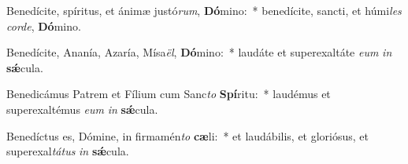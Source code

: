 \item Benedícite, spíritus, et ánimæ justó\textit{rum}, \textbf{Dó}mino:~* benedícite, sancti, et húmi\textit{les} \textit{cor}\textit{de}, \textbf{Dó}mino.
\item Benedícite, Ananía, Azaría, Mísa\textit{ël}, \textbf{Dó}mino:~* laudáte et superexaltáte \textit{e}\textit{um} \textit{in} \textbf{sǽ}cula.
\item Benedicámus Patrem et Fílium cum Sanc\textit{to} \textbf{Spí}ritu:~* laudémus et superexaltémus \textit{e}\textit{um} \textit{in} \textbf{sǽ}cula.
\item Benedíctus es, Dómine, in firmamén\textit{to} \textbf{cæ}li:~* et laudábilis, et gloriósus, et superexal\textit{tá}\textit{tus} \textit{in} \textbf{sǽ}cula.
